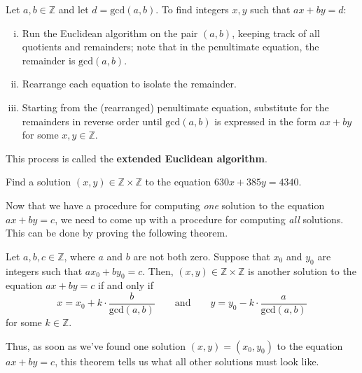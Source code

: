 \begin{prooftip}
Let $a,b \in \mathbb{Z}$ and let $d = \mathrm{gcd}(a,b)$. To find integers $x,y$ such that $ax+by=d$:
\begin{enumerate}[(i)]
\item Run the Euclidean algorithm on the pair $(a,b)$, keeping track of all quotients and remainders; note that in the penultimate equation, the remainder is $\mathrm{gcd}(a,b)$.
\item Rearrange each equation to isolate the remainder.
\item Starting from the (rearranged) penultimate equation, substitute for the remainders in reverse order until $\mathrm{gcd}(a,b)$ is expressed in the form $ax+by$ for some $x,y \in \mathbb{Z}$.
\end{enumerate}
This process is called the \textbf{extended Euclidean algorithm}.
\end{prooftip}

\begin{exercise}
Find a solution $(x,y) \in \mathbb{Z} \times \mathbb{Z}$ to the equation $630x + 385y = 4340$.
\end{exercise}

Now that we have a procedure for computing \textit{one} solution to the equation $ax+by=c$, we need to come up with a procedure for computing \textit{all} solutions. This can be done by proving the following theorem.

\begin{theorem}
\label{thmAllSolutionsOfLDEFromOneSolution}
Let $a,b,c \in \mathbb{Z}$, where $a$ and $b$ are not both zero. Suppose that $x_0$ and $y_0$ are integers such that $ax_0+by_0 = c$. Then, $(x,y) \in \mathbb{Z} \times \mathbb{Z}$ is another solution to the equation $ax+by=c$ if and only if
\[ x = x_0 + k \cdot \frac{b}{\mathrm{gcd}(a,b)} \qquad \text{and} \qquad y = y_0 - k \cdot \frac{a}{\mathrm{gcd}(a,b)} \]
for some $k \in \mathbb{Z}$.
\end{theorem}

Thus, as soon as we've found one solution $(x,y)=(x_0,y_0)$ to the equation $ax+by=c$, this theorem tells us what all other solutions must look like.

